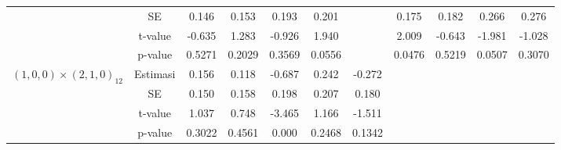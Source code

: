 \begin{enumerate}[label=\alph*.]
\begin{longtable}{|c|c|c|c|c|c|c|c|c|c|c|}
            & SE
            & {0.146} & {0.153}
            & {0.193} & {0.201} & {}
            & {0.175} & {0.182}
            & {0.266} & {0.276} \\ \cline{2-11}

            & t-value
            & {-0.635} & {1.283}
            & {-0.926} & {1.940} & {}
            & {2.009} & {-0.643}
            & {-1.981} & {-1.028} \\ \cline{2-11}

            & p-value
            & {0.5271} & {0.2029}
            & {0.3569} & {0.0556} & {}
            & {0.0476} & {0.5219}
            & {0.0507} & {0.3070} \\ \hline

            \multirow{4}{*}{$(1,0,0)\times(2,1,0)_{12}$}
            & Estimasi
            & {0.156} & {0.118}
            & {-0.687} & {0.242} & {-0.272}
            & {} & {}
            & {} & {} \\ \cline{2-11}

            & SE
            & {0.150} & {0.158}
            & {0.198} & {0.207} & {0.180}
            & {} & {}
            & {} & {} \\ \cline{2-11}

            & t-value
            & {1.037} & {0.748}
            & {-3.465} & {1.166} & {-1.511}
            & {} & {}
            & {} & {} \\ \cline{2-11}

            & p-value
            & {0.3022} & {0.4561}
            & {0.000} & {0.2468} & {0.1342}
            & {} & {}
            & {} & {} \\ \hline

        \end{longtable}
        \normalsize
\end{enumerate}